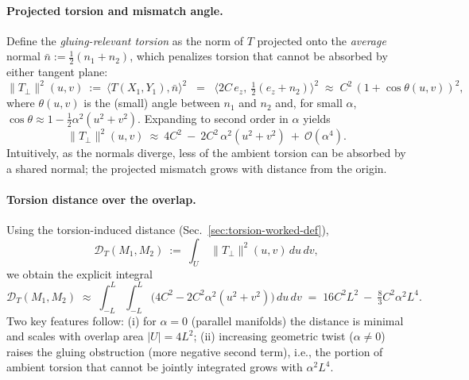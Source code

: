 \documentclass[a4paper,11pt]{article}
\begin{document}
\paragraph{Projected torsion and mismatch angle.}
Define the \emph{gluing-relevant torsion} as the norm of $T$ projected onto the
\emph{average} normal $\bar n:=\tfrac{1}{2}(n_1+n_2)$, which penalizes torsion
that cannot be absorbed by either tangent plane:
\[
\|T_{\perp}\|^2(u,v)\ :=\ \big\langle T(X_1,Y_1),\bar n\big\rangle^2
\;\;=\;\; \big\langle 2C\,e_z,\ \tfrac{1}{2}(e_z+n_2)\big\rangle^2
\;\approx\; C^2\,(1+\cos\theta(u,v))^2,
\]
where $\theta(u,v)$ is the (small) angle between $n_1$ and $n_2$ and, for
small $\alpha$, $\cos\theta\approx 1-\tfrac{1}{2}\alpha^2(u^2+v^2)$. Expanding
to second order in $\alpha$ yields
\[
\|T_{\perp}\|^2(u,v)\ \approx\ 4C^2\ -\ 2C^2\,\alpha^2(u^2+v^2)\ +\ \mathcal{O}(\alpha^4).
\]
Intuitively, as the normals diverge, less of the ambient torsion can be
absorbed by a shared normal; the projected mismatch grows with distance from
the origin.

\paragraph{Torsion distance over the overlap.}
Using the torsion-induced distance (Sec.~\ref{sec:torsion-worked-def}),
\[
\mathcal{D}_T(M_1,M_2)\ :=\ \int_{U}\ \|T_{\perp}\|^2(u,v)\,du\,dv,
\]
we obtain the explicit integral
\[
\mathcal{D}_T(M_1,M_2)
\;\approx\;
\int_{-L}^{L}\!\!\int_{-L}^{L} \Big(4C^2 - 2C^2\alpha^2(u^2+v^2)\Big)\,du\,dv
\;=\; 16C^2 L^2\ -\ \tfrac{8}{3}C^2\alpha^2 L^4.
\]
Two key features follow:
(i) for $\alpha=0$ (parallel manifolds) the distance is minimal and scales with
overlap area $|U|=4L^2$; (ii) increasing geometric twist ($\alpha\neq 0$)
raises the gluing obstruction (more negative second term), i.e., the portion of
ambient torsion that cannot be jointly integrated grows with $\alpha^2 L^4$.
\end{document}

